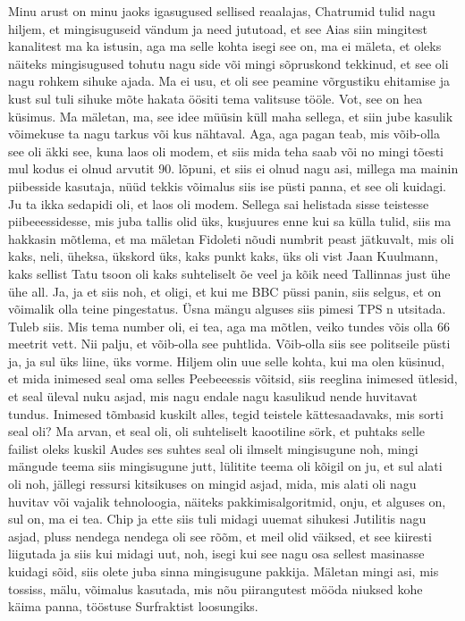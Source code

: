 Minu arust on minu jaoks igasugused sellised reaalajas, Chatrumid tulid nagu hiljem, et mingisuguseid vändum ja need jututoad, et see Aias siin mingitest kanalitest ma ka istusin, aga ma selle kohta isegi see on, ma ei mäleta, et oleks näiteks mingisugused tohutu nagu side või mingi sõpruskond tekkinud, et see oli nagu rohkem sihuke ajada. Ma ei usu, et oli see peamine võrgustiku ehitamise ja kust sul tuli sihuke mõte hakata öösiti tema valitsuse tööle.
Vot, see on hea küsimus. Ma mäletan, ma, see idee müüsin küll maha sellega, et siin jube kasulik võimekuse ta nagu tarkus või kus nähtaval. Aga, aga pagan teab, mis võib-olla see oli äkki see, kuna laos oli modem, et siis mida teha saab või no mingi tõesti mul kodus ei olnud arvutit 90. lõpuni, et siis ei olnud nagu asi, millega ma mainin piibesside kasutaja, nüüd tekkis võimalus siis ise püsti panna, et see oli kuidagi. Ju ta ikka sedapidi oli, et laos oli modem. Sellega sai helistada sisse teistesse piibeeessidesse, mis juba tallis olid üks, kusjuures enne kui sa külla tulid, siis ma hakkasin mõtlema, et ma mäletan Fidoleti nõudi numbrit peast jätkuvalt, mis oli kaks, neli, üheksa, ükskord üks, kaks punkt kaks, üks oli vist Jaan Kuulmann, kaks sellist Tatu tsoon oli kaks suhteliselt õe veel ja kõik need Tallinnas just ühe ühe all. Ja, ja et siis noh, et oligi, et kui me BBC püssi panin, siis selgus, et on võimalik olla teine pingestatus. Üsna mängu alguses siis pimesi TPS n utsitada.
Tuleb siis. Mis tema number oli, ei tea, aga ma mõtlen, veiko tundes võis olla 66 meetrit vett. Nii palju, et võib-olla see puhtlida. Võib-olla siis see politseile püsti ja, ja sul üks liine, üks vorme.
Hiljem olin uue selle kohta, kui ma olen küsinud, et mida inimesed seal oma selles Peebeeessis võitsid, siis reeglina inimesed ütlesid, et seal üleval nuku asjad, mis nagu endale nagu kasulikud nende huvitavat tundus. Inimesed tõmbasid kuskilt alles, tegid teistele kättesaadavaks, mis sorti seal oli?
Ma arvan, et seal oli, oli suhteliselt kaootiline sörk, et puhtaks selle failist oleks kuskil Audes ses suhtes seal oli ilmselt mingisugune noh, mingi mängude teema siis mingisugune jutt, lülitite teema oli kõigil on ju, et sul alati oli noh, jällegi ressursi kitsikuses on mingid asjad, mida, mis alati oli nagu huvitav või vajalik tehnoloogia, näiteks pakkimisalgoritmid, onju, et alguses on, sul on, ma ei tea. Chip ja ette siis tuli midagi uuemat sihukesi Jutilitis nagu asjad, pluss nendega nendega oli see rõõm, et meil olid väiksed, et see kiiresti liigutada ja siis kui midagi uut, noh, isegi kui see nagu osa sellest masinasse kuidagi sõid, siis olete juba sinna mingisugune pakkija. Mäletan mingi asi, mis tossiss, mälu, võimalus kasutada, mis nõu piirangutest mööda niuksed kohe käima panna, tööstuse Surfraktist loosungiks.
